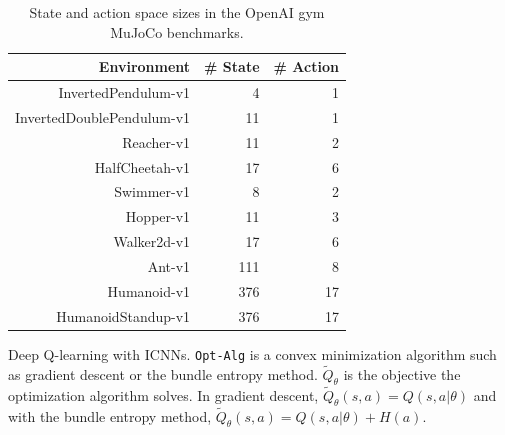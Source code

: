 \begin{table}[H]
  \centering
  \begin{tabular}{rrr}
    Environment & \# State & \# Action \\ \hline
    InvertedPendulum-v1	& 4 & 1 \\
    InvertedDoublePendulum-v1	& 11 & 1 \\
    Reacher-v1	& 11 & 2 \\
    HalfCheetah-v1	& 17 & 6 \\
    Swimmer-v1	& 8 & 2 \\
    Hopper-v1	& 11 & 3 \\
    Walker2d-v1	& 17 & 6 \\ %
    Ant-v1	& 111 & 8 \\
    Humanoid-v1	& 	376 & 17 \\
    HumanoidStandup-v1	& 	376 & 17 \\
  \end{tabular}
  \caption{State and action space sizes in the OpenAI gym MuJoCo benchmarks.}
  \label{tab:gym-szs}
\end{table}

\begin{algorithm}[H]
  \caption{Deep Q-learning with ICNNs.
    \texttt{Opt-Alg} is a convex minimization algorithm such as
    gradient descent or the bundle entropy method.
    $\tilde Q_\theta$ is the objective the optimization algorithm solves.
    In gradient descent, $\tilde Q_\theta(s,a) = Q(s, a|\theta)$ and
    with the bundle entropy method, $\tilde Q_\theta(s,a) = Q(s, a|\theta) + H(a)$.
  }
  \begin{algorithmic}
    \State {}
    \EndFor
    \EndFor
    \EndFor
  \end{algorithmic}
  \label{alg:icnn-rl}
\end{algorithm}

